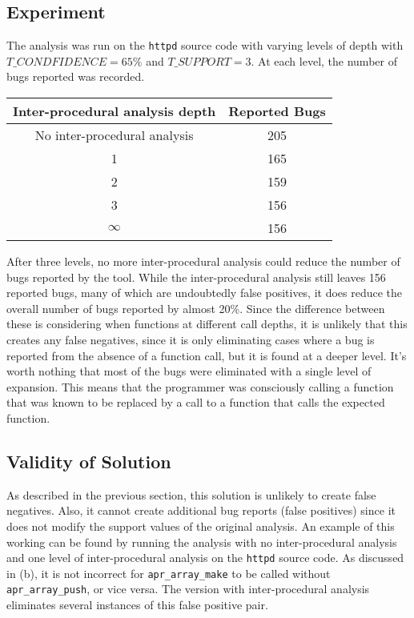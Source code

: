 \documentclass[10pt,a4paper]{article}
\begin{document}
\subsection{Experiment}
The analysis was run on the \texttt{httpd} source code with varying levels of depth with $T\_CONDFIDENCE=65\%$ and $T\_SUPPORT=3$. At each level, the number of bugs reported was recorded.
\begin{center}
\begin{tabular}{c|c}
\textbf{Inter-procedural analysis depth} & \textbf{Reported Bugs}\\\hline
No inter-procedural analysis & 205\\
1 & 165\\
2 & 159\\
3 & 156\\
$\infty$ & 156\\
\end{tabular}
\end{center}
After three levels, no more inter-procedural analysis could reduce the number of bugs reported by the tool. While the inter-procedural analysis still leaves 156 reported bugs, many of which are undoubtedly false positives, it does reduce the overall number of bugs reported by almost 20\%. Since the difference between these is considering when functions at different call depths, it is unlikely that this creates any false negatives, since it is only eliminating cases where a bug is reported from the absence of a function call, but it is found at a deeper level. It's worth nothing that most of the bugs were eliminated with a single level of expansion. This means that the programmer was consciously calling a function that was known to be replaced by a call to a function that calls the expected function.
\subsection{Validity of Solution}
As described in the previous section, this solution is unlikely to create false negatives. Also, it cannot create additional bug reports (false positives) since it does not modify the support values of the original analysis. An example of this working can be found by running the analysis with no inter-procedural analysis and one level of inter-procedural analysis on the \texttt{httpd} source code. As discussed in (b), it is not incorrect for \texttt{apr\_array\_make} to be called without \texttt{apr\_array\_push}, or vice versa. The version with inter-procedural analysis eliminates several instances of this false positive pair.
\end{document}
